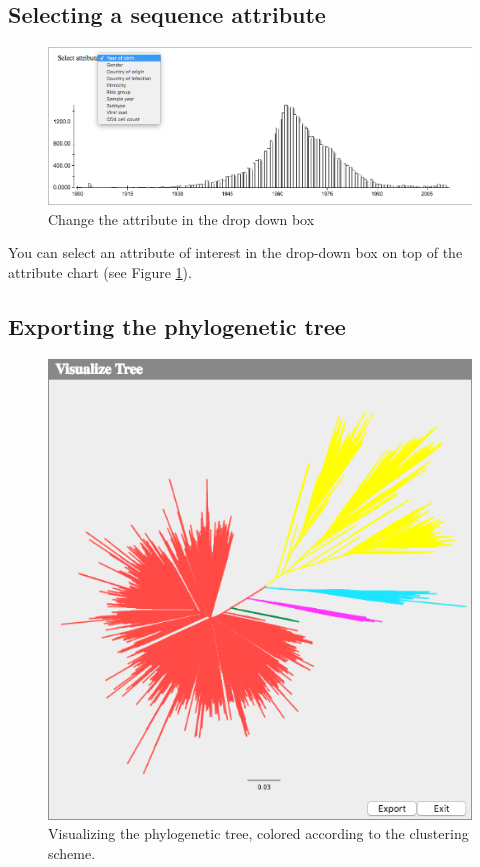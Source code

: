 \documentclass[a4paper, 11pt]{article} %
\begin{document}
\subsection{Selecting a sequence attribute}
\begin{figure}[H]
\centering
\includegraphics[scale=0.38]{images/change_attr.PNG}
\vspace{-0.75cm}
\caption{Change the attribute in the drop down box}
\label{fig:change_attr}
\end{figure}
You can select an attribute of interest in the drop-down box on top of the attribute chart (see Figure \ref{fig:change_attr}).


\subsection{Exporting the phylogenetic tree}
\begin{figure}[H]
\centering
\includegraphics[scale=0.50]{images/view_tree.PNG}
\vspace{-0.25cm}
\caption{Visualizing the phylogenetic tree, colored according to the clustering scheme.}
\label{fig:view_tree}
\end{figure}
\end{document}
